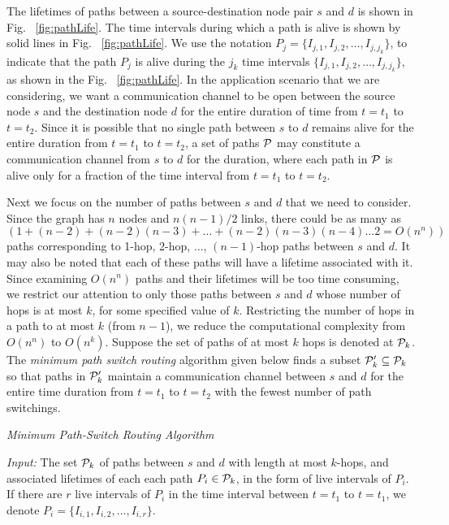 \documentclass[10pt]{IEEEtran}
\begin{document}
The lifetimes of paths between a source-destination node pair $s$ and $d$ is shown in Fig.~ \ref{fig:pathLife}. The time intervals during which a path is alive is shown by solid lines in Fig.~ \ref{fig:pathLife}. We use the notation $P_j = \{I_{j, 1}, I_{j, 2}, \ldots, I_{j, j_k}\}$, to indicate that the path $P_j$ is alive during the $j_k$ time intervals $\{I_{j, 1}, I_{j, 2}, \ldots, I_{j, j_k}\}$, as shown in the Fig.~ \ref{fig:pathLife}. In the application scenario that we are considering, we want a communication channel to be open between the source node $s$ and the destination node $d$ for the entire duration of time from $t = t_1$ to $t = t_2$. Since it is possible that no single path between $s$ to $d$ remains alive for the entire duration from $t = t_1$ to $t = t_2$, a set of paths $\cal P$ may constitute a communication channel from $s$ to $d$ for the duration, where each path in $\cal P$ is alive only for a fraction of the time interval from $t = t_1$ to $t = t_2$.

Next we focus on the number of paths between $s$ and $d$ that we need to consider. Since the graph has $n$ nodes and $n(n -1)/2$ links, there could be as many as $(1 + (n - 2) + (n - 2)(n - 3) + \ldots + (n - 2)(n - 3)(n - 4) \ldots 2 = O(n^n))$ paths corresponding to 1-hop, 2-hop, $\ldots$, $(n - 1)$-hop paths between $s$ and $d$. It may also be noted that each of these paths will have a lifetime associated with it. Since examining $O(n^n)$ paths and their lifetimes will be too time consuming, we restrict our attention to only those paths between $s$ and $d$ whose number of hops is at most $k$, for some specified value of $k$. Restricting the number of hops in a path to at most $k$ (from $n -1$), we reduce the computational complexity from $O(n^n)$ to $O(n^k)$. Suppose the set of paths of at most $k$ hops is denoted at ${\cal P}_k$. The {\em minimum path switch routing} algorithm given below finds a subset ${\cal P}'_k \subseteq {\cal P}_k$ so that paths in ${\cal P}'_k$ maintain a communication channel between $s$ and $d$ for the entire time duration from $t = t_1$ to $t = t_2$ with the fewest number of path switchings.

\medskip
\noindent
{\em Minimum Path-Switch Routing Algorithm }

\vspace{0.1in}
\noindent
{\it Input:} The set ${\cal P}_k$ of paths between $s$ and $d$ with length at most $k$-hops, and associated lifetimes of each each path $P_i \in {\cal P}_k$, in the form of live intervals of $P_i$. If there are $r$ live intervals of $P_i$ in the time interval between $t = t_1$ to $t = t_1$, we denote $P_i = \lbrace I_{i, 1}, I_{i, 2}, \ldots, I_{i, r}\rbrace$.
\end{document}
